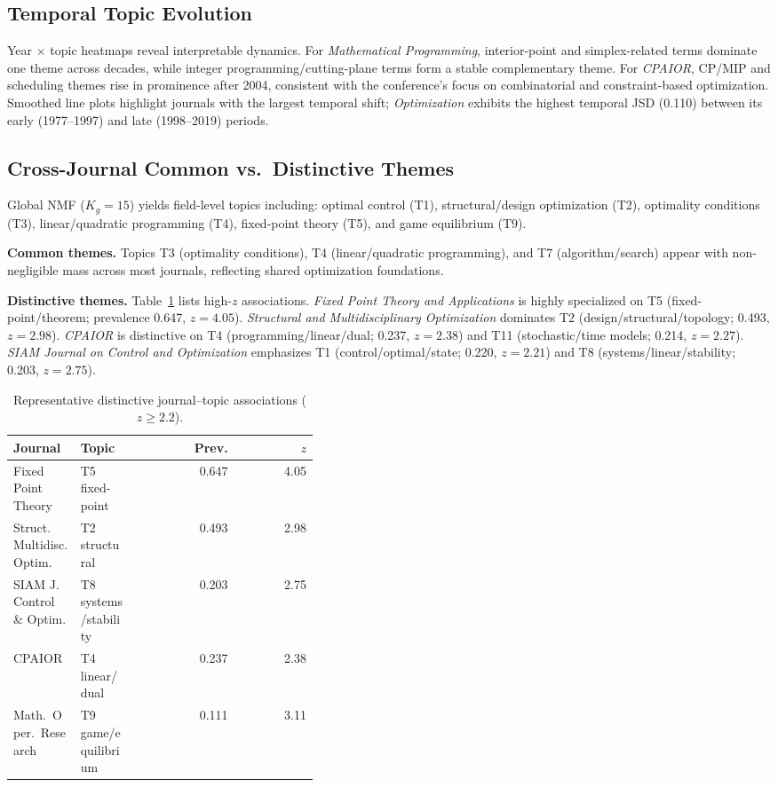 \documentclass[conference]{IEEEtran}
\begin{document}
\subsection{Temporal Topic Evolution}
Year $\times$ topic heatmaps reveal interpretable dynamics.
For \emph{Mathematical Programming}, interior-point and simplex-related terms dominate one theme across decades, while integer programming/cutting-plane terms form a stable complementary theme.
For \emph{CPAIOR}, CP/MIP and scheduling themes rise in prominence after 2004, consistent with the conference's focus on combinatorial and constraint-based optimization.
Smoothed line plots highlight journals with the largest temporal shift; \emph{Optimization} exhibits the highest temporal JSD (0.110) between its early (1977--1997) and late (1998--2019) periods.

\subsection{Cross-Journal Common vs.\ Distinctive Themes}
Global NMF ($K_g=15$) yields field-level topics including: optimal control (T1), structural/design optimization (T2), optimality conditions (T3), linear/quadratic programming (T4), fixed-point theory (T5), and game equilibrium (T9).

\textbf{Common themes.} Topics T3 (optimality conditions), T4 (linear/quadratic programming), and T7 (algorithm/search) appear with non-negligible mass across most journals, reflecting shared optimization foundations.

\textbf{Distinctive themes.} Table~\ref{tab:distinctive} lists high-$z$ associations.
\emph{Fixed Point Theory and Applications} is highly specialized on T5 (fixed-point/theorem; prevalence 0.647, $z=4.05$).
\emph{Structural and Multidisciplinary Optimization} dominates T2 (design/structural/topology; 0.493, $z=2.98$).
\emph{CPAIOR} is distinctive on T4 (programming/linear/dual; 0.237, $z=2.38$) and T11 (stochastic/time models; 0.214, $z=2.27$).
\emph{SIAM Journal on Control and Optimization} emphasizes T1 (control/optimal/state; 0.220, $z=2.21$) and T8 (systems/linear/stability; 0.203, $z=2.75$).

\begin{table}[t]
\centering
\caption{Representative distinctive journal--topic associations ($z\ge 2.2$).}
\label{tab:distinctive}
\small
\begin{tabular}{p{0.22\linewidth}p{0.18\linewidth}rr}
\toprule
Journal & Topic & Prev. & $z$ \\
\midrule
Fixed Point Theory & T5 fixed-point & 0.647 & 4.05 \\
Struct.\ Multidisc. Optim. & T2 structural & 0.493 & 2.98 \\
SIAM J. Control \& Optim. & T8 systems/stability & 0.203 & 2.75 \\
CPAIOR & T4 linear/dual & 0.237 & 2.38 \\
Math.\ Oper.\ Research & T9 game/equilibrium & 0.111 & 3.11 \\
\bottomrule
\end{tabular}
\end{table}
\end{document}
